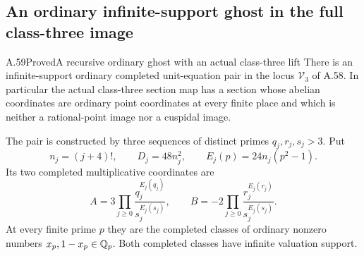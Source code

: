 \subsection{An ordinary infinite-support ghost in the full class-three image}


\begin{statement}{A.59}{Proved}{A recursive ordinary ghost with an actual class-three lift}
There is an infinite-support ordinary completed unit-equation pair in the
locus $\mathcal V_3$ of A.58. In particular the actual
class-three section map has a section whose abelian
coordinates are ordinary point coordinates at every
finite place and which is neither a rational-point
image nor a cuspidal image.

The pair is constructed by three sequences of distinct
primes $q_j,r_j,s_j>3$. Put
\[
 n_j=(j+4)!,\qquad D_j=48n_j^2,\qquad
 E_j(p)=24n_j(p^2-1).
 \tag{A.59.1}
\]
Its two completed multiplicative coordinates are
\[
 A=3\prod_{j\ge0}\frac{q_j^{E_j(q_j)}}{s_j^{E_j(s_j)}},
 \qquad
 B=-2\prod_{j\ge0}\frac{r_j^{E_j(r_j)}}{s_j^{E_j(s_j)}}.
 \tag{A.59.2}
\]
At every finite prime $p$ they are the completed
classes of ordinary nonzero numbers $x_p,1-x_p\in\mathbb Q_p$.
Both completed classes have infinite valuation support.
\end{statement}
